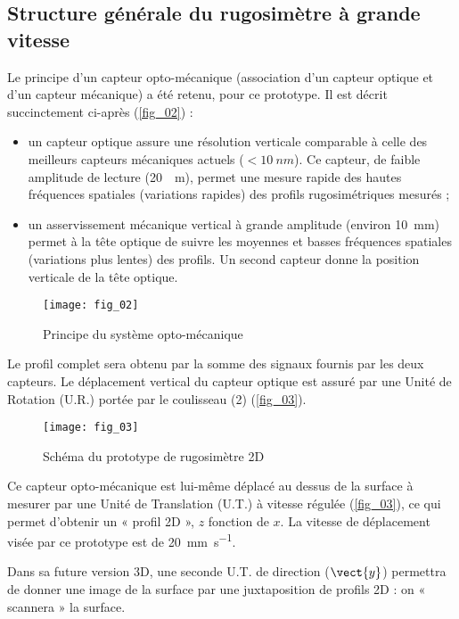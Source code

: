 \subsection{Structure générale du rugosimètre à grande vitesse}
\ifprof
\else
Le principe d’un capteur opto-mécanique (association d’un capteur optique et d’un capteur mécanique) a
été retenu, pour ce prototype. Il est décrit succinctement ci-après (\autoref{fig_02}) :
\begin{itemize}
\item un capteur optique assure une résolution verticale comparable à celle des meilleurs capteurs mécaniques actuels ($< \SI{10}{nm}$). Ce capteur, de faible amplitude de lecture (\SI{20}{\mu m}), permet une mesure rapide des hautes fréquences spatiales (variations rapides) des profils rugosimétriques mesurés ;
\item un asservissement mécanique vertical à grande amplitude (environ \SI{10}{mm}) permet à la tête optique de suivre les moyennes et basses fréquences spatiales (variations plus lentes) des profils. Un second capteur donne la position verticale de la tête optique.
\end{itemize}


\begin{figure}[H]
\centering
\texttt{[image: fig\_02]}
\caption{\label{fig_02} Principe du système opto-mécanique}
\end{figure}

Le profil complet sera obtenu par la somme des signaux fournis par les deux capteurs. Le déplacement
vertical du capteur optique est assuré par une Unité de Rotation (U.R.) portée par le coulisseau (2)
(\autoref{fig_03}).

\begin{figure}[H]
\centering
\texttt{[image: fig\_03]}
\caption{\label{fig_03} Schéma du prototype de rugosimètre 2D}
\end{figure}

Ce capteur opto-mécanique est lui-même déplacé au dessus de la surface à mesurer par une Unité de
Translation (U.T.) à vitesse régulée (\autoref{fig_03}), ce qui permet d’obtenir un « profil 2D », $z$ fonction de $x$. La
vitesse de déplacement visée par ce prototype est de \SI{20}{mm.s^{-1}}.

Dans sa future version 3D, une seconde U.T. de direction ($\vect{y}$) permettra de donner une image de la surface
par une juxtaposition de profils 2D : on « scannera » la surface.

